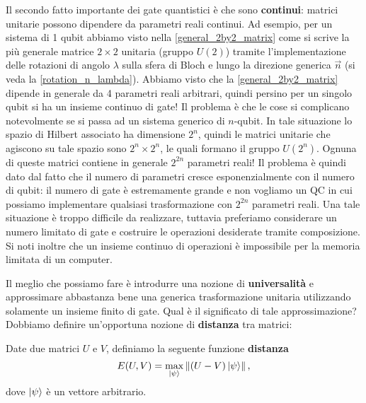 \noindent Il secondo fatto importante dei gate quantistici è che sono \textbf{continui}: matrici unitarie possono dipendere da parametri reali continui. Ad esempio, per un sistema di 1 qubit abbiamo visto nella \eqref{general_2by2_matrix} come si scrive la più generale matrice $2 \times 2$ unitaria (gruppo $U(2)$) tramite l'implementazione delle rotazioni di angolo $\lambda$ sulla sfera di Bloch e lungo la direzione generica $\vec{n}$ (si veda la \eqref{rotation_n_lambda}). Abbiamo visto che la \eqref{general_2by2_matrix} dipende in generale da 4 parametri reali arbitrari, quindi persino per un singolo qubit si ha un insieme continuo di gate! Il problema è che le cose si complicano notevolmente se si passa ad un sistema generico di $n$-qubit. In tale situazione lo spazio di Hilbert associato ha dimensione $2^n$, quindi le matrici unitarie che agiscono su tale spazio sono $2^n \times 2^n$, le quali formano il gruppo $U(2^n)$. Ognuna di queste matrici contiene in generale $2^{2n}$ parametri reali! Il problema è quindi dato dal fatto che il numero di parametri cresce esponenzialmente con il numero di qubit: il numero di gate è estremamente grande e non vogliamo un QC in cui possiamo implementare qualsiasi trasformazione con $2^{2n}$ parametri reali. Una tale situazione è troppo difficile da realizzare, tuttavia preferiamo considerare un numero limitato di gate e costruire le operazioni desiderate tramite composizione. Si noti inoltre che un insieme continuo di operazioni è impossibile per la memoria limitata di un computer. 

\noindent Il meglio che possiamo fare è introdurre una nozione di \textbf{universalità} e approssimare abbastanza bene una generica trasformazione unitaria utilizzando solamente un insieme finito di gate. Qual è il significato di tale approssimazione? Dobbiamo definire un'opportuna nozione di \textbf{distanza} tra matrici:

\begin{definizione}
    Date due matrici $U$ e $V$, definiamo la seguente funzione \textbf{distanza}
    \begin{equation*}
        E(U,V) = \max\limits_{\ket{\psi}} \norm{(U-V) \ket{\psi}} \, ,
    \end{equation*}
    dove $\ket{\psi}$ è un vettore arbitrario.
\end{definizione}

